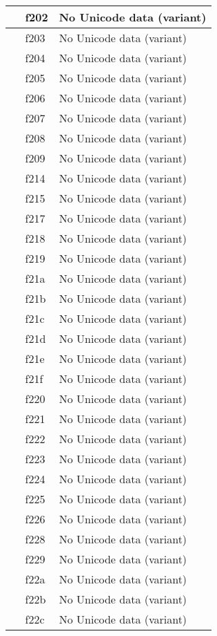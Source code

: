 \documentclass[12pt,letterpaper,openany]{book}
\begin{document}
\begin{center}
\begin{supertabular}{|m{0.25in}|m{0.5in}|m{4in}|}
 & f202 & No Unicode data (variant)\\\hline
 & f203 & No Unicode data (variant)\\\hline
 & f204 & No Unicode data (variant)\\\hline
 & f205 & No Unicode data (variant)\\\hline
 & f206 & No Unicode data (variant)\\\hline
 & f207 & No Unicode data (variant)\\\hline
 & f208 & No Unicode data (variant)\\\hline
 & f209 & No Unicode data (variant)\\\hline
 & f214 & No Unicode data (variant)\\\hline
 & f215 & No Unicode data (variant)\\\hline
 & f217 & No Unicode data (variant)\\\hline
 & f218 & No Unicode data (variant)\\\hline
 & f219 & No Unicode data (variant)\\\hline
 & f21a & No Unicode data (variant)\\\hline
 & f21b & No Unicode data (variant)\\\hline
 & f21c & No Unicode data (variant)\\\hline
 & f21d & No Unicode data (variant)\\\hline
 & f21e & No Unicode data (variant)\\\hline
 & f21f & No Unicode data (variant)\\\hline
 & f220 & No Unicode data (variant)\\\hline
 & f221 & No Unicode data (variant)\\\hline
 & f222 & No Unicode data (variant)\\\hline
 & f223 & No Unicode data (variant)\\\hline
 & f224 & No Unicode data (variant)\\\hline
 & f225 & No Unicode data (variant)\\\hline
 & f226 & No Unicode data (variant)\\\hline
 & f228 & No Unicode data (variant)\\\hline
 & f229 & No Unicode data (variant)\\\hline
 & f22a & No Unicode data (variant)\\\hline
 & f22b & No Unicode data (variant)\\\hline
 & f22c & No Unicode data (variant)\\\hline

\end{supertabular}
\end{center}
\end{document}
